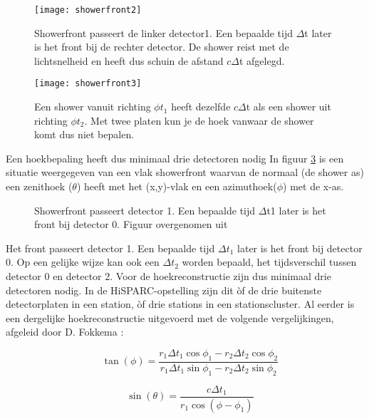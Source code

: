 \begin{figure}[H]
    \centering
    \texttt{[image: showerfront2]}
    \caption{Showerfront passeert de linker detector1. Een bepaalde tijd $\Delta$t later is het front bij de rechter detector. De shower reist met de lichtsnelheid en heeft dus schuin de afstand $c\Delta$t afgelegd.}
   \label{fig:showerfront2}
\end{figure}

\begin{figure}[H]
    \centering
    \texttt{[image: showerfront3]}
    \caption{Een shower vanuit richting $\phi t_{1}$ heeft dezelfde $c\Delta$t als een shower uit richting  $\phi t_{2}$. Met twee platen kun je de hoek vanwaar de shower komt dus niet bepalen. }
   \label{fig:showerfront3}
\end{figure}

Een hoekbepaling heeft dus minimaal drie detectoren nodig
In figuur \ref{fig:front} is een situatie weergegeven van een vlak showerfront
waarvan de normaal (de shower as) een zenithoek ($\theta$) heeft met het (x,y)-vlak en een azimuthoek($\phi$) met de x-as.

\begin{figure}[H]
    \centering
    
    \caption{Showerfront passeert detector 1. Een bepaalde tijd $\Delta$t1 later is het front bij detector 0.  Figuur overgenomen uit  \cite{Fokkema}}\label{fig:front}
\end{figure}

Het front passeert detector 1. Een bepaalde tijd $\Delta t_{1}$ later is het front bij detector 0. Op een gelijke wijze kan ook een $\Delta t_{2}$ worden bepaald, het tijdsverschil tussen detector 0 en detector 2. Voor de hoekreconstructie zijn dus minimaal drie detectoren nodig. In de HiSPARC-opstelling zijn dit òf de drie buitenste detectorplaten in een station, òf drie stations in een stationscluster. Al eerder is een dergelijke hoekreconstructie uitgevoerd met de volgende vergelijkingen, afgeleid door D. Fokkema \cite{Fokkema}:

\begin{equation}
	   \quad \tan(\phi)= \frac{r_1\Delta t_1\cos\phi_1-r_2\Delta t_2\cos \phi_2}{r_1\Delta t_1\sin\phi_1-r_2\Delta t_2\sin \phi_2}
\end{equation}

\begin{equation}
	    \quad \sin(\theta)= \frac{c\Delta t_1}{r_1\cos(\phi-\phi_1)}
\end{equation}

